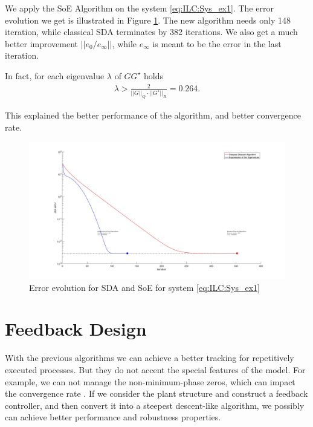 \begin{exam}
	We apply the SoE Algorithm on the system \eqref{eq:ILC:Sys_ex1}. The error evolution we get is illustrated in Figure \ref{img:ILC:SDAvsSE}. The new algorithm needs only 148 iteration, while classical SDA terminates by 382 iterations. We also get a much better improvement $||e_0/e_\infty||$, while $e_\infty$  is meant to be the error in the last iteration. 
	
	In fact, for each eigenvalue $\lambda$ of $G G^\star$ holds 
	\begin{align}
	\lambda > \frac{2}{||G||_Q\cdot||G^\star||_R} = 0.264.
	\end{align}
	
	This explained the better performance of the algorithm, and better convergence rate.  		
	\begin{figure}[ht]
		\centering
		\includegraphics[width=\textwidth]{fig/Ex1_SDAvsES.jpg}
		\caption{Error evolution for SDA and SoE for system \eqref{eq:ILC:Sys_ex1}}
		\label{img:ILC:SDAvsSE}
	\end{figure}
	
\end{exam}

\section{Feedback Design}

With the previous algorithms we can achieve a better tracking for repetitively executed processes.  But they do not accent the special features of the model. For example, we can not manage the non-minimum-phase zeros, which can impact the convergence rate \cite{ILC}. 
If we consider the plant structure and construct a feedback controller, and then convert it into a steepest descent-like algorithm, we possibly can achieve better performance and robustness properties. 

